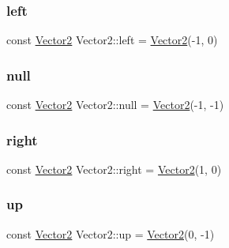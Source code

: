 \mbox{\label{struct_vector2_aaad26bbee0364de1e6a8676215886a2f}} 
\subsubsection{\texorpdfstring{left}{left}}
{\footnotesize\ttfamily const \mbox{\hyperlink{struct_vector2}{Vector2}} Vector2\+::left = \mbox{\hyperlink{struct_vector2}{Vector2}}(-\/1, 0)\hspace{0.3cm}{\ttfamily [static]}}

\mbox{\label{struct_vector2_a2c6e0149051082f87c4f63f97e07c7ae}} 
\subsubsection{\texorpdfstring{null}{null}}
{\footnotesize\ttfamily const \mbox{\hyperlink{struct_vector2}{Vector2}} Vector2\+::null = \mbox{\hyperlink{struct_vector2}{Vector2}}(-\/1, -\/1)\hspace{0.3cm}{\ttfamily [static]}}

\mbox{\label{struct_vector2_aa9712253176cedb918592990df5ea611}} 
\subsubsection{\texorpdfstring{right}{right}}
{\footnotesize\ttfamily const \mbox{\hyperlink{struct_vector2}{Vector2}} Vector2\+::right = \mbox{\hyperlink{struct_vector2}{Vector2}}(1, 0)\hspace{0.3cm}{\ttfamily [static]}}

\mbox{\label{struct_vector2_a0de964f9acb5cc8669d0b3b9f5b9d4eb}} 
\subsubsection{\texorpdfstring{up}{up}}
{\footnotesize\ttfamily const \mbox{\hyperlink{struct_vector2}{Vector2}} Vector2\+::up = \mbox{\hyperlink{struct_vector2}{Vector2}}(0, -\/1)\hspace{0.3cm}{\ttfamily [static]}}

